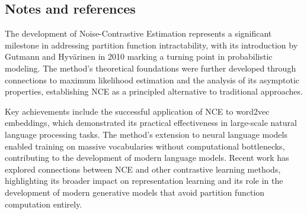 \subsection{Notes and references}

The development of Noise-Contrastive Estimation represents a significant milestone in addressing partition function intractability, with its introduction by Gutmann and Hyvärinen in 2010 marking a turning point in probabilistic modeling. The method's theoretical foundations were further developed through connections to maximum likelihood estimation and the analysis of its asymptotic properties, establishing NCE as a principled alternative to traditional approaches.

Key achievements include the successful application of NCE to word2vec embeddings, which demonstrated its practical effectiveness in large-scale natural language processing tasks. The method's extension to neural language models enabled training on massive vocabularies without computational bottlenecks, contributing to the development of modern language models. Recent work has explored connections between NCE and other contrastive learning methods, highlighting its broader impact on representation learning and its role in the development of modern generative models that avoid partition function computation entirely.

